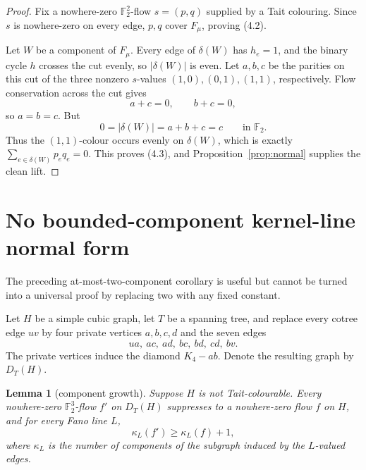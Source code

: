 \documentclass[11pt]{article}
\newtheorem{lemma}[theorem]{Lemma}
\theoremstyle{definition}
\theoremstyle{remark}
\newcommand{\F}{\mathbb F}
\begin{document}
\begin{proof}
Fix a nowhere-zero \(\F_2^2\)-flow \(s=(p,q)\) supplied by a Tait
colouring.  Since \(s\) is nowhere-zero on every edge, \(p,q\) cover
\(F_\mu\), proving (4.2).

Let \(W\) be a component of \(F_\mu\).  Every edge of \(\delta(W)\) has
\(h_e=1\), and the binary cycle \(h\) crosses the cut evenly, so
\(|\delta(W)|\) is even.  Let \(a,b,c\) be the parities on this cut of
the three nonzero \(s\)-values \((1,0),(0,1),(1,1)\), respectively.
Flow conservation across the cut gives
\[
                          a+c=0,\qquad b+c=0,
\]
so \(a=b=c\).  But
\[
                      0=|\delta(W)|=a+b+c=c
                      \qquad\text{in }\F_2.
\]
Thus the \((1,1)\)-colour occurs evenly on \(\delta(W)\), which is
exactly
\(\sum_{e\in\delta(W)}p_eq_e=0\).  This proves (4.3), and
Proposition~\ref{prop:normal} supplies the clean lift.
\end{proof}

\section{No bounded-component kernel-line normal form}
\label{sec:unbounded}

The preceding at-most-two-component corollary is useful but cannot be
turned into a universal proof by replacing two with any fixed constant.

Let \(H\) be a simple cubic graph, let \(T\) be a spanning tree, and
replace every cotree edge \(uv\) by four private vertices \(a,b,c,d\)
and the seven edges
\[
                   ua,\ ac,\ ad,\ bc,\ bd,\ cd,\ bv.   \tag{5.1}
\]
The private vertices induce the diamond \(K_4-ab\).  Denote the resulting
graph by \(D_T(H)\).

\begin{lemma}[component growth]\label{lem:component-growth}
Suppose \(H\) is not Tait-colourable.  Every nowhere-zero
\(\F_2^3\)-flow \(f'\) on \(D_T(H)\) suppresses to a nowhere-zero flow
\(f\) on \(H\), and for every Fano line \(L\),
\[
                       \kappa_L(f')\ge\kappa_L(f)+1,    \tag{5.2}
\]
where \(\kappa_L\) is the number of components of the subgraph induced
by the \(L\)-valued edges.
\end{lemma}
\end{document}

